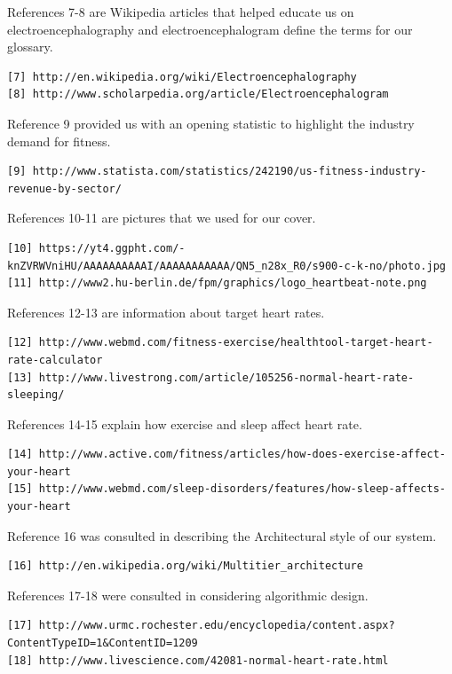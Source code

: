 \documentclass[letterpaper,english, 12pt]{scrreprt}
\begin{document}
References 7-8 are Wikipedia articles that helped educate us on electroencephalography and electroencephalogram define the terms for our glossary.
\begin{verbatim}
[7] http://en.wikipedia.org/wiki/Electroencephalography
[8] http://www.scholarpedia.org/article/Electroencephalogram
\end{verbatim}

Reference 9 provided us with an opening statistic to highlight the industry demand for fitness.
\begin{verbatim}
[9] http://www.statista.com/statistics/242190/us-fitness-industry-revenue-by-sector/
\end{verbatim}

References 10-11 are pictures that we used for our cover.
\begin{verbatim}
[10] https://yt4.ggpht.com/-knZVRWVniHU/AAAAAAAAAAI/AAAAAAAAAAA/QN5_n28x_R0/s900-c-k-no/photo.jpg
[11] http://www2.hu-berlin.de/fpm/graphics/logo_heartbeat-note.png
\end{verbatim}


References 12-13 are information about target heart rates.
\begin{verbatim}
[12] http://www.webmd.com/fitness-exercise/healthtool-target-heart-rate-calculator
[13] http://www.livestrong.com/article/105256-normal-heart-rate-sleeping/
\end{verbatim}

References 14-15 explain how exercise and sleep affect heart rate.
\begin{verbatim}
[14] http://www.active.com/fitness/articles/how-does-exercise-affect-your-heart
[15] http://www.webmd.com/sleep-disorders/features/how-sleep-affects-your-heart
\end{verbatim}

Reference 16 was consulted in describing the Architectural style of our system.
\begin{verbatim}
[16] http://en.wikipedia.org/wiki/Multitier_architecture
\end{verbatim}

References 17-18 were consulted in considering algorithmic design.
\begin{verbatim}
[17] http://www.urmc.rochester.edu/encyclopedia/content.aspx?ContentTypeID=1&ContentID=1209
[18] http://www.livescience.com/42081-normal-heart-rate.html
\end{verbatim}
\end{document}
